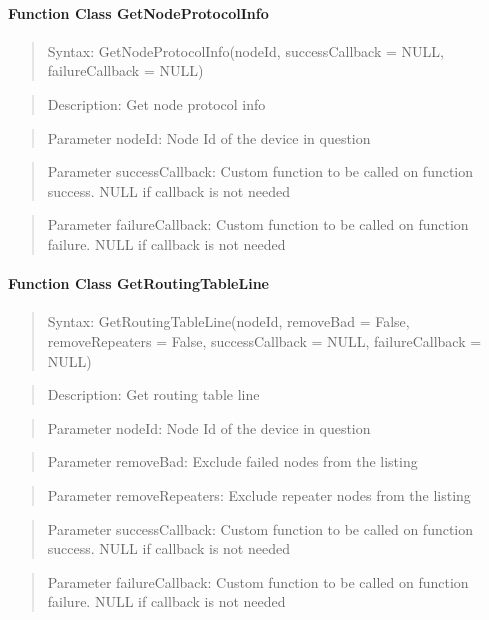 \paragraph {Function Class GetNodeProtocolInfo}
\begin{quote} Syntax: GetNodeProtocolInfo(nodeId, successCallback = NULL, failureCallback = NULL)\end{quote}
\begin{quote} Description: Get node protocol info\end{quote}
\begin{quote} Parameter nodeId: Node Id of the device in question\end{quote}
\begin{quote} Parameter successCallback: Custom function to be called on function success. NULL if callback is not needed\end{quote} 
\begin{quote} Parameter failureCallback: Custom function to be called on function failure. NULL if callback is not needed\end{quote} 

\paragraph {Function Class GetRoutingTableLine}
\begin{quote} Syntax: GetRoutingTableLine(nodeId, removeBad = False, removeRepeaters = False, successCallback = NULL, failureCallback = NULL)\end{quote}
\begin{quote} Description: Get routing table line\end{quote}
\begin{quote} Parameter nodeId: Node Id of the device in question\end{quote}
\begin{quote} Parameter removeBad: Exclude failed nodes from the listing\end{quote}
\begin{quote} Parameter removeRepeaters: Exclude repeater nodes from the listing\end{quote}
\begin{quote} Parameter successCallback: Custom function to be called on function success. NULL if callback is not needed\end{quote} 
\begin{quote} Parameter failureCallback: Custom function to be called on function failure. NULL if callback is not needed\end{quote} 

